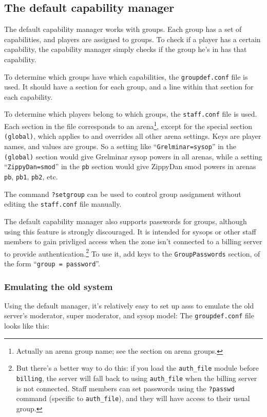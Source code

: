 \documentclass{article}
\newcommand{\asss}{asss}
\begin{document}
\subsection{The default capability manager}

The default capability manager works with groups. Each group has a set
of capabilities, and players are assigned to groups. To check if a
player has a certain capability, the capability manager simply checks if
the group he's in has that capability.

To determine which groups have which capabilities, the
\verb/groupdef.conf/ file is used. It should have a section for each
group, and a line within that section for each capability.

To determine which players belong to which groups, the \verb/staff.conf/
file is used. Each section in the file corresponds to an
arena\footnote{Actually an arena group name; see the section on arena
groups.}, except for the special section \verb/(global)/, which applies
to and overrides all other arena settings. Keys are player names, and
values are groups. So a setting like ``\verb/Grelminar=sysop/'' in the
\verb/(global)/ section would give Grelminar sysop powers in all arenas,
while a setting ``\verb/ZippyDan=smod/'' in the \verb/pb/ section would
give ZippyDan smod powers in arenas \verb/pb/, \verb/pb1/, \verb/pb2/,
etc.

The command \verb/?setgroup/ can be used to control group assignment
without editing the \verb/staff.conf/ file manually.

The default capability manager also supports passwords for groups,
although using this feature is strongly discouraged. It is intended for
sysops or other staff members to gain privliged access when the zone
isn't connected to a billing server to provide
authentication.\footnote{But there's a better way to do this: if you
load the \texttt{auth\_file} module before \texttt{billing}, the server
will fall back to using \texttt{auth\_file} when the billing server is
not connected. Staff members can set passwords using the
\texttt{?passwd} command (specific to \texttt{auth\_file}), and they
will have access to their usual group.} To use it, add keys to the
\verb/GroupPasswords/ section, of the form ``\verb/group = password/''.


\subsubsection{Emulating the old system}
Using the default manager, it's relatively easy to set up \asss{} to
emulate the old server's moderator, super moderator, and sysop model:
The \verb/groupdef.conf/ file looks like this:
\end{document}
